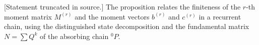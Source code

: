 [Statement truncated in source.] The proposition relates the finiteness of the $r$-th moment matrix $M^{(r)}$ and the moment vectors $b^{(r)}$ and $c^{(r)}$ in a recurrent chain, using the distinguished state decomposition and the fundamental matrix $N = \sum Q^k$ of the absorbing chain $^{0}\!P$.
